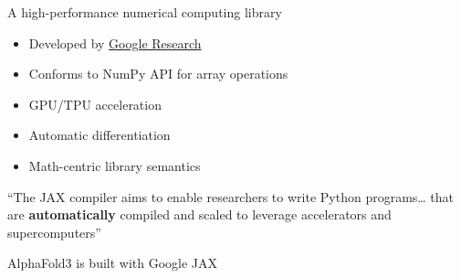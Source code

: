 \begin{frame}
    
    A high-performance numerical computing library 

            \vspace{0.5em}
            \vspace{0.5em}

    \begin{itemize}
        \item Developed by \href{https://research.google/}{Google Research}
            \vspace{0.5em}
        \item Conforms to NumPy API for array operations
            \vspace{0.5em}
        \item GPU/TPU acceleration 
            \vspace{0.5em}
        \item Automatic differentiation
            \vspace{0.5em}
        \item Math-centric library semantics
    \end{itemize}

            \vspace{0.5em}
            \vspace{0.5em}

    ``The JAX compiler aims to enable researchers to write Python programs\ldots
    that are \textbf{automatically} compiled and scaled to leverage accelerators and
        supercomputers''

\end{frame}

\begin{frame}
    
    \Eg AlphaFold3 is built with Google JAX

        \vspace{0.5em}

    \begin{figure}
       \begin{center} %
       \end{center}
    \end{figure}


\end{frame}

